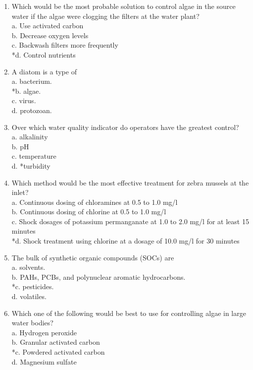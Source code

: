 \begin{enumerate}
  \item Which would be the most probable solution to control algae in the source water if the algae were clogging the filters at the water plant?\\
a. Use activated carbon\\
b. Decrease oxygen levels\\
c. Backwash filters more frequently\\
*d. Control nutrients\\

  \item A diatom is a type of\\
a. bacterium.\\
*b. algae.\\
c. virus.\\
d. protozoan.\\ 

\item Over which water quality indicator do operators have the greatest control?\\
a. alkalinity\\
b. $\mathrm{pH}$\\
c. temperature\\
d. *turbidity\\

  \item Which method would be the most effective treatment for zebra mussels at the inlet?\\
a. Continuous dosing of chloramines at 0.5 to 1.0 mg/l\\
b. Continuous dosing of chlorine at 0.5 to 1.0 mg/l\\
c. Shock dosages of potassium permanganate at 1.0 to 2.0 mg/l for at least 15 minutes\\
*d. Shock treatment using chlorine at a dosage of 10.0 mg/l for 30 minutes\\
  \item The bulk of synthetic organic compounds (SOCs) are\\
a. solvents.\\
b. PAHs, PCBs, and polynuclear aromatic hydrocarbons.\\
*c. pesticides.\\
d. volatiles.\\


  \item Which one of the following would be best to use for controlling algae in large water bodies?\\
a. Hydrogen peroxide\\
b. Granular activated carbon\\
*c. Powdered activated carbon\\
d. Magnesium sulfate 


\end{enumerate}
